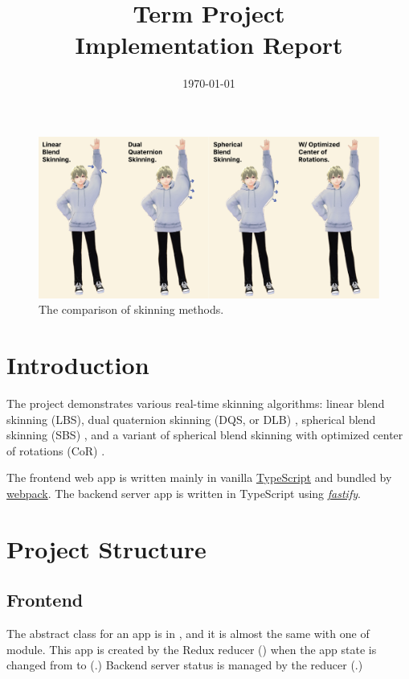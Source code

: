 \documentclass{homework}
\title{Term Project\\[7pt] Implementation Report}
\date{\today}
\begin{document}
\maketitle


\tableofcontents


\begin{figure}[H]
    \centering
    \includegraphics[width=\textwidth]{images/compare-skinning-methods.png}
    \caption{The comparison of skinning methods.}
\end{figure}

\setcounter{section}{-1}

\section{Introduction}
The project demonstrates various real-time skinning algorithms: linear blend skinning (LBS), dual quaternion skinning (DQS, or DLB) \cite{Kavan2008}, spherical blend skinning (SBS) \cite{Kavan2005}, and a variant of spherical blend skinning with optimized center of rotations (CoR) \cite{Le2016}.

The frontend web app is written mainly in vanilla \href{https://www.typescriptlang.org/}{TypeScript} and bundled by \href{https://webpack.js.org/}{webpack}. The backend server app is written in TypeScript using \href{https://www.fastify.io/}{\textit{fastify}}.

\section{Project Structure}
\subsection{Frontend}
The abstract class for an app is in , and it is almost the same with one of  module. This app is created by the Redux reducer () when the app state is changed from  to  (.) Backend server status is managed by the reducer (.)
\end{document}
